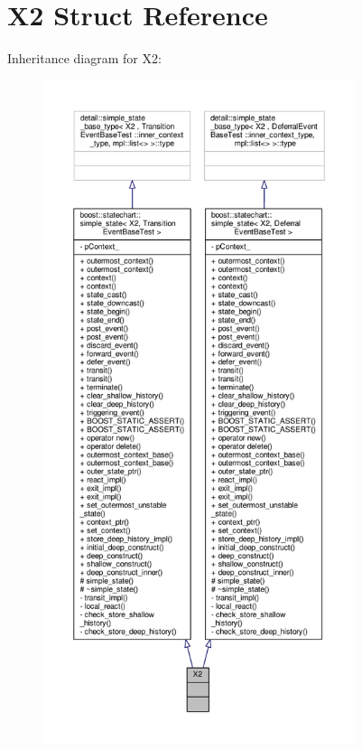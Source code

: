 \hypertarget{struct_x2}{}\section{X2 Struct Reference}
\label{struct_x2}


Inheritance diagram for X2\+:
\nopagebreak
\begin{figure}[H]
\begin{center}
\leavevmode
\includegraphics[height=550pt]{struct_x2__inherit__graph}
\end{center}
\end{figure}


